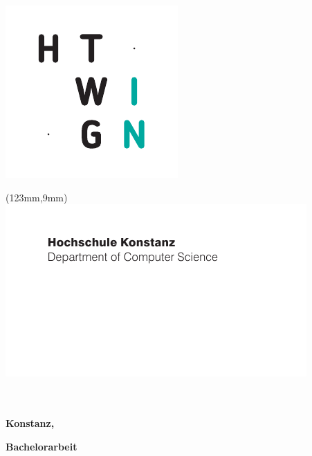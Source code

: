 \begin{titlepage}

\vspace*{-3.5cm}

\begin{flushleft}
\hspace*{-1cm} \includegraphics{htwg/htwg_in_pos_2}
\end{flushleft}


\begin{textblock*}{288mm}(123mm,9mm)
\includegraphics[]{htwg/htwg_in_pos_1}
\end{textblock*}


\vspace{2.0cm}

\begin{center}
	\huge{
		\textbf{\thema} \\[5cm]
	}
	\Large{
		\textbf{\autor}} \\[5.5cm]
	\large{
		\textbf{Konstanz, \abgabedatum} \\[2.3cm]
	}

	\Huge{
		\textbf{Bachelorarbeit}
	}
\end{center}

\end{titlepage}
